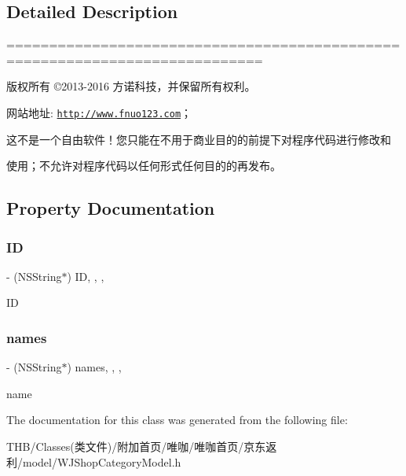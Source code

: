 \subsection{Detailed Description}
============================================================================

版权所有 ©2013-\/2016 方诺科技，并保留所有权利。

网站地址\+: \href{http://www.fnuo123.com}{\tt http\+://www.\+fnuo123.\+com}； 



这不是一个自由软件！您只能在不用于商业目的的前提下对程序代码进行修改和

使用；不允许对程序代码以任何形式任何目的的再发布。 

 

\subsection{Property Documentation}
\mbox{\label{interface_w_j_shop_category_model_a00566b3eb3e8e96992373630521197d9}} 
\subsubsection{\texorpdfstring{ID}{ID}}
{\footnotesize\ttfamily -\/ (N\+S\+String$\ast$) ID\hspace{0.3cm}{\ttfamily [read]}, {\ttfamily [write]}, {\ttfamily [nonatomic]}, {\ttfamily [copy]}}

ID \mbox{\label{interface_w_j_shop_category_model_ac15d7fb100b4d11f0f38219134165c57}} 
\subsubsection{\texorpdfstring{names}{names}}
{\footnotesize\ttfamily -\/ (N\+S\+String$\ast$) names\hspace{0.3cm}{\ttfamily [read]}, {\ttfamily [write]}, {\ttfamily [nonatomic]}, {\ttfamily [copy]}}

name 

The documentation for this class was generated from the following file\+:\begin{DoxyCompactItemize}
\item 
T\+H\+B/\+Classes(类文件)/附加首页/唯咖/唯咖首页/京东返利/model/W\+J\+Shop\+Category\+Model.\+h\end{DoxyCompactItemize}
